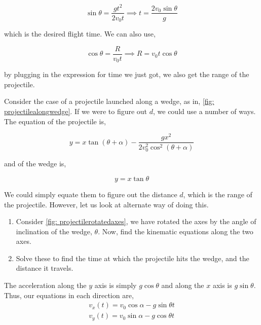 \begin{exc}
\begin{solution}
        \begin{equation*}
            \sin\theta = \frac{gt^2}{2v_0t} \implies t = \frac{2v_0\sin\theta}{g}
        \end{equation*}

        which is the desired flight time. We can also use,

        \begin{equation*}
            \cos\theta = \frac{R}{v_0t} \implies R = v_0t\cos\theta
        \end{equation*}

        by plugging in the expression for time we just got, we also get the range of the projectile. 
    \end{solution}
    
    \begin{exercise}[subtitle={Projectile Motion in tilted axes.}, points = 3]
        Consider the case of a projectile launched along a wedge, as in,
        \cref{fig: projectilealongwedge}. If we were to figure out \(d\), we could 
        use a number of ways. The equation of the projectile is,

        \begin{equation*}
            y = x\tan(\theta+\alpha) - \frac{gx^2}{2v_0^2\cos^2(\theta+\alpha)}
        \end{equation*}

        and of the wedge is,

        \begin{equation*}
            y = x\tan\theta 
        \end{equation*}

        We could simply equate them to figure out the distance \(d\), which is the range of the projectile.
        However, let us look at alternate way of doing this.

        \begin{enumerate}[label=(\alph*)]
            \item Consider \cref{fig: projectilerotatedaxes}, we have rotated the axes by the angle of inclination of the wedge, \(\theta\). Now, find the kinematic equations along the two axes.
            \item Solve these to find the time at which the projectile hits the wedge, and the distance it travels. 
        \end{enumerate}

    \end{exercise}

    \begin{solution}
        The acceleration along the \(y\) axis is simply \(g\cos\theta\) and along the \(x\) axis 
        is \(g\sin\theta\). Thus, our equations in each direction are,
            \begin{align*}
                v_x(t) = v_0\cos\alpha - g\sin\theta t\\
                v_y(t) = v_0\sin\alpha - g\cos\theta t 
            \end{align*}


\end{solution}
\end{exc}
